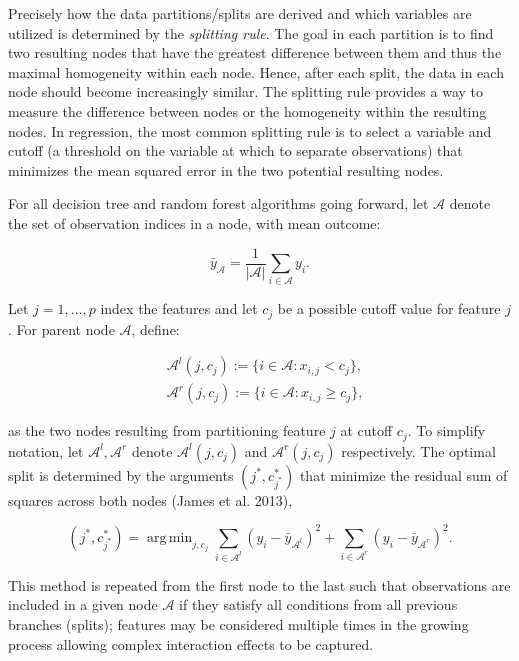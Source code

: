 \documentclass[
  letterpaper,
  krantz2]{style/krantz}
\begin{document}
Precisely how the data partitions/splits are derived and which variables
are utilized is determined by the \emph{splitting
rule}. The goal in each partition
is to find two resulting nodes that have the greatest difference between
them and thus the maximal homogeneity within each node. Hence, after
each split, the data in each node should become increasingly similar.
The splitting rule provides a way to measure the difference between
nodes or the homogeneity within the resulting nodes. In regression, the
most common splitting rule is to select a variable and cutoff (a
threshold on the variable at which to separate observations) that
minimizes the mean squared error in the two potential resulting nodes.

For all decision tree and random forest algorithms going forward, let
\(\mathcal{A}\) denote the set of observation indices in a node, with
mean outcome:

\[
\bar{y}_{\mathcal{A}} = \frac{1}{\vert \mathcal{A} \vert}\sum_{i \in \mathcal{A}} y_i.
\]

Let \(j = 1,\ldots,p\) index the features and let \(c_j\) be a possible
cutoff value for feature \(j\). For parent node \(\mathcal{A}\), define:

\[
\begin{aligned}
&\mathcal{A}^l(j,c_j) := \{i \in \mathcal{A}: x_{i,j} < c_j\}, \\
&\mathcal{A}^r(j,c_j) := \{i \in \mathcal{A}: x_{i,j} \geq c_j\},
\end{aligned}
\]

as the two nodes resulting from partitioning feature \(j\) at cutoff
\(c_j\). To simplify notation, let \(\mathcal{A}^l, \mathcal{A}^r\)
denote \(\mathcal{A}^l(j,c_j)\) and \(\mathcal{A}^r(j,c_j)\)
respectively. The optimal split is determined by the arguments
\((j^*, c^*_{j^*})\) that minimize the residual sum of squares across
both nodes (James et al. 2013),

\[
(j^*, c_{j^*}^*) = \mathop{\mathrm{arg\,min}}_{j, c_j} \sum_{i \in \mathcal{A}^l} (y_i - \bar{y}_{\mathcal{A}^l})^2 + \sum_{i \in \mathcal{A}^r} (y_i - \bar{y}_{\mathcal{A}^r})^2.
\]

This method is repeated from the first node to the last such that
observations are included in a given node \(\mathcal{A}\) if they
satisfy all conditions from all previous branches (splits); features may
be considered multiple times in the growing process allowing complex
interaction effects to be captured.
\end{document}

